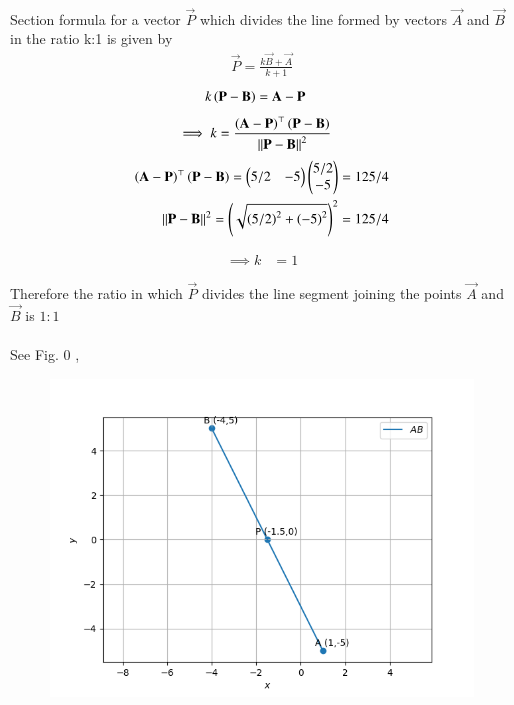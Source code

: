 \documentclass[journal]{IEEEtran}
\begin{document}
\\
Section formula for a vector $\vec{P}$ which divides the line formed by vectors $\vec{A}$ and $\vec{B}$ in the ratio k:1 is given by
\begin{align}
    \vec{P}=\frac{k\vec{B}+\vec{A}}{k+1}
\end{align}
\begin{align}
			k\left(\mathbf{P}-\mathbf{B}\right)&= \mathbf{A}-\mathbf{P}
\end{align}
\begin{align}
    \implies k &=
			\frac{\left(\mathbf{A}-\mathbf{P}\right)^{\top}\left(\mathbf{P}-\mathbf{B}\right)}{\left\lVert\mathbf{P}-\mathbf{B}\right\rVert^2}
\end{align}
\bigskip
\begin{align}
\left(\mathbf{A}-\mathbf{P}\right)^{\top}\left(\mathbf{P}-\mathbf{B}\right) = \begin{pmatrix}5/2 & -5\end{pmatrix}\begin{pmatrix}5/2\\-5\end{pmatrix} = 125/4\\
{\left\lVert\mathbf{P}-\mathbf{B}\right\rVert^2} = \left(\sqrt{\left(5/2\right)^2 + \left(-5\right)^2}\right)^2 = 125/4
\end{align}

\begin{align}
\implies k &= 1
\end{align}

Therefore the ratio in which $\vec{P}$ divides the line segment joining the points $\vec{A}$ and $\vec{B}$ is $1:1$\\
\\
See Fig. 0 ,
\begin{figure}[H]
\begin{center}
\includegraphics[width=0.6\columnwidth]{figs/fig.png}
\end{center}
\caption{}
\label{fig:Fig1}
\end{figure}
\end{document}
